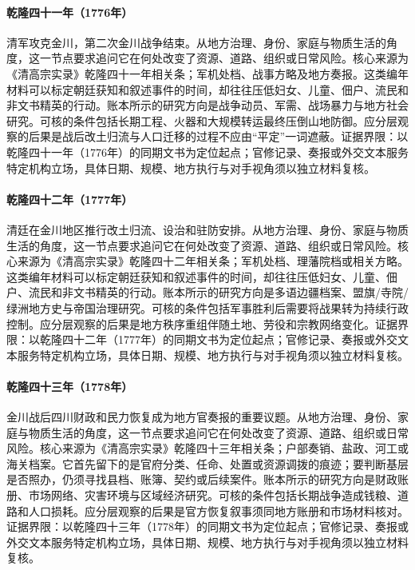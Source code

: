 \hypertarget{social:EQ-1776-JINCHUAN-CONQUEST}{}\paragraph{乾隆四十一年（1776年）}清军攻克金川，第二次金川战争结束。从地方治理、身份、家庭与物质生活的角度，这一节点要求追问它在何处改变了资源、道路、组织或日常风险。核心来源为《清高宗实录》乾隆四十一年相关条；军机处档、战事方略及地方奏报。这类编年材料可以标定朝廷获知和叙述事件的时间，却往往压低妇女、儿童、佃户、流民和非文书精英的行动。账本所示的研究方向是战争动员、军需、战场暴力与地方社会研究。可核的条件包括长期工程、火器和大规模转运最终压倒山地防御。应分层观察的后果是战后改土归流与人口迁移的过程不应由“平定”一词遮蔽。证据界限：以乾隆四十一年（1776年）的同期文书为定位起点；官修记录、奏报或外交文本服务特定机构立场，具体日期、规模、地方执行与对手视角须以独立材料复核。
\hypertarget{social:EQ-1777-JINCHUAN-ADMINISTRATIVE-RESET}{}\paragraph{乾隆四十二年（1777年）}清廷在金川地区推行改土归流、设治和驻防安排。从地方治理、身份、家庭与物质生活的角度，这一节点要求追问它在何处改变了资源、道路、组织或日常风险。核心来源为《清高宗实录》乾隆四十二年相关条；军机处档、理藩院档或相关方略。这类编年材料可以标定朝廷获知和叙述事件的时间，却往往压低妇女、儿童、佃户、流民和非文书精英的行动。账本所示的研究方向是多语边疆档案、盟旗/寺院/绿洲地方史与帝国治理研究。可核的条件包括军事胜利后需要将战果转为持续行政控制。应分层观察的后果是地方秩序重组伴随土地、劳役和宗教网络变化。证据界限：以乾隆四十二年（1777年）的同期文书为定位起点；官修记录、奏报或外交文本服务特定机构立场，具体日期、规模、地方执行与对手视角须以独立材料复核。
\hypertarget{social:EQ-1778-SICHUAN-TAX-RECOVERY}{}\paragraph{乾隆四十三年（1778年）}金川战后四川财政和民力恢复成为地方官奏报的重要议题。从地方治理、身份、家庭与物质生活的角度，这一节点要求追问它在何处改变了资源、道路、组织或日常风险。核心来源为《清高宗实录》乾隆四十三年相关条；户部奏销、盐政、河工或海关档案。它首先留下的是官府分类、任命、处置或资源调拨的痕迹；要判断基层是否照办，仍须寻找县档、账簿、契约或后续案件。账本所示的研究方向是财政账册、市场网络、灾害环境与区域经济研究。可核的条件包括长期战争造成钱粮、道路和人口损耗。应分层观察的后果是官方恢复叙事须同地方账册和市场材料核对。证据界限：以乾隆四十三年（1778年）的同期文书为定位起点；官修记录、奏报或外交文本服务特定机构立场，具体日期、规模、地方执行与对手视角须以独立材料复核。
